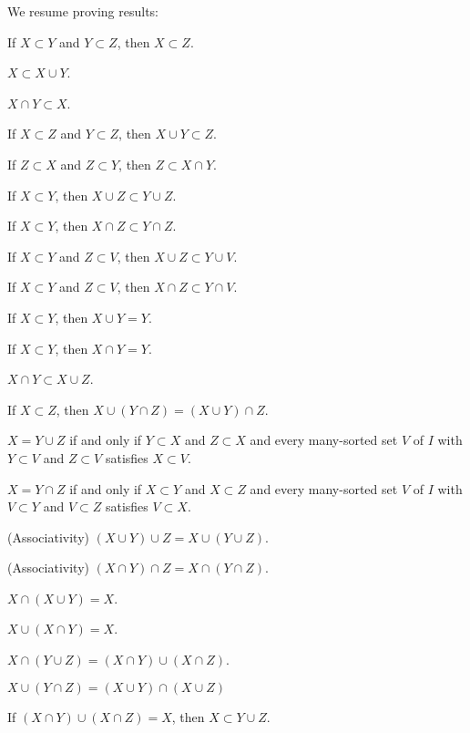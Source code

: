\documentclass{article}
\begin{document}
We resume proving results:
\begin{thm}
\item\label{pboole:13} If $X\subset Y$ and $Y\subset Z$, then $X\subset Z$.
\item\label{pboole:14} $X\subset X\cup Y$.
\item\label{pboole:15} $X\cap Y\subset X$.
\item\label{pboole:16} If $X\subset Z$ and $Y\subset Z$, then $X\cup Y\subset Z$.
\item\label{pboole:17} If $Z\subset X$ and $Z\subset Y$,
  then $Z\subset X\cap Y$.
\item\label{pboole:18} If $X\subset Y$, then $X\cup Z\subset Y\cup Z$.
\item\label{pboole:19} If $X\subset Y$, then $X\cap Z\subset Y\cap Z$.
\item\label{pboole:20} If $X\subset Y$ and $Z\subset V$, then $X\cup Z\subset Y\cup V$.
\item\label{pboole:21} If $X\subset Y$ and $Z\subset V$, then $X\cap Z\subset Y\cap V$.
\item\label{pboole:22} If $X\subset Y$, then $X\cup Y=Y$.
\item\label{pboole:23} If $X\subset Y$, then $X\cap Y=Y$.
\item\label{pboole:24} $X\cap Y\subset X\cup Z$.
\item\label{pboole:25} If $X\subset Z$, then $X\cup(Y\cap Z)=(X\cup Y)\cap Z$.
\item\label{pboole:26} $X=Y\cup Z$ if and only if $Y\subset X$ and
  $Z\subset X$ and every many-sorted set $V$ of $I$ with $Y\subset V$
  and $Z\subset V$ satisfies $X\subset V$.
\item\label{pboole:27} $X=Y\cap Z$ if and only if $X\subset Y$ and
  $X\subset Z$ and every many-sorted set $V$ of $I$ with $V\subset Y$
  and $V\subset Z$ satisfies $V\subset X$.
\item\label{pboole:28} (Associativity) $(X\cup Y)\cup Z=X\cup(Y\cup Z)$.
\item\label{pboole:29} (Associativity) $(X\cap Y)\cap Z=X\cap(Y\cap Z)$.
\item\label{pboole:30} $X\cap(X\cup Y)=X$.
\item\label{pboole:31} $X\cup(X\cap Y)=X$.
\item\label{pboole:32} $X\cap(Y\cup Z)=(X\cap Y)\cup(X\cap Z)$.
\item\label{pboole:33} $X\cup (Y\cap Z)=(X\cup Y)\cap(X\cup Z)$
\item\label{pboole:34} If $(X\cap Y)\cup(X\cap Z)=X$, then $X\subset Y\cup Z$.

\end{thm}
\end{document}
